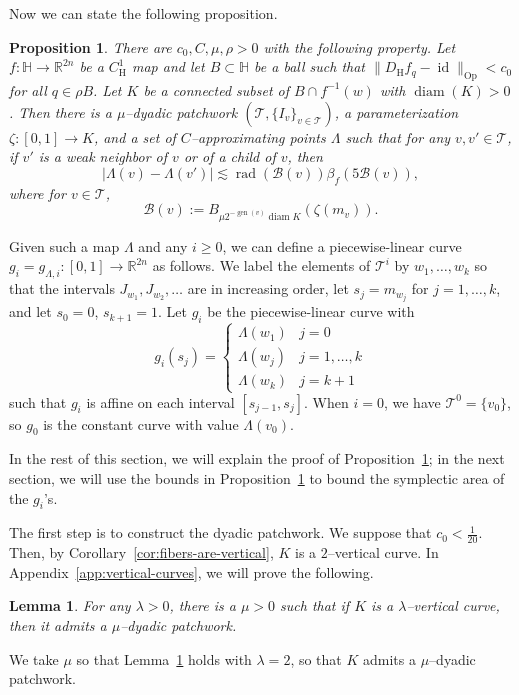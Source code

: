 \documentclass[12pt,reqno]{amsart}
\newcommand{\cB}{\mathcal{B}}
\newcommand{\cT}{\mathcal{T}}
\newcommand{\DfH}{D_\mathrm{H}f}
\DeclareMathOperator{\rad}{rad}
\DeclareMathOperator{\gen}{gen}
\newcommand{\HH}{\mathbb{H}}
\newcommand{\R}{\mathbb{R}}
\newcommand{\from}{\colon}
\newtheorem{lemma}[thm]{Lemma}
\newtheorem{prop}[thm]{Proposition}
\theoremstyle{remark}
\newcommand{\0}{\mathbf{0}}
\renewcommand{\1}{\mathbf 1}
\DeclareMathOperator{\diam}{diam}
\DeclareMathOperator{\id}{id}
\begin{document}
Now we can state the following proposition.
\begin{prop}\label{prop:construct-Lambda}
  There are $c_0, C, \mu, \rho>0$ with the following property. Let $f\from \HH\to \R^{2n}$ be a $C^1_{\mathrm{H}}$ map and let $B\subset \HH$ be a ball such that $\|\DfH_q - \id\|_{\mathrm{Op}} < c_0$ for all $q\in \rho B$. Let $K$ be a connected subset of $B\cap f^{-1}(w)$ with $\diam(K)>0$. Then there is a $\mu$--dyadic patchwork $(\cT, \{I_v\}_{v\in \cT})$, a parameterization $\zeta\from [0,1]\to K$, and a set of $C$--approximating points $\Lambda$ such that for any $v, v'\in \cT$, if $v'$ is a weak neighbor of $v$ or of a child of $v$, then
  \begin{equation}\label{eq:children-neighbors}
    |\Lambda(v) - \Lambda(v')| \lesssim \rad(\cB(v)) \beta_f(5 \cB(v)),
  \end{equation}
  where for $v\in \cT$,
  \begin{equation}\label{eq:def-cbv}
    \cB(v) := B_{\mu 2^{-\gen(v)}\diam K}(\zeta(m_v)).
  \end{equation}
    
\end{prop}

Given such a map $\Lambda$ and any $i\ge 0$, we can define a piecewise-linear curve $g_i = g_{\Lambda, i}\from [0,1]\to \R^{2n}$ as follows. We label the elements of $\cT^i$ by $w_1,\dots, w_{k}$ so that the intervals $J_{w_1},J_{w_2},\dots$ are in increasing order, let $s_j = m_{w_j}$ for $j=1,\dots, k$, and let $s_0=0$, $s_{k+1}=1$. Let $g_i$ be the piecewise-linear curve with
\begin{equation}\label{eq:def-gi-Lambda}
  g_i(s_j)= \begin{cases}
    \Lambda(w_1) & j=0\\
    \Lambda(w_j) & j = 1,\dots, k\\
    \Lambda(w_k) & j = k+1
  \end{cases}
\end{equation}
such that $g_i$ is affine on each interval $[s_{j-1},s_j]$. When $i=0$, we have $\cT^0=\{v_0\}$, so $g_0$ is the constant curve with value $\Lambda(v_0)$.

In the rest of this section, we will explain the proof of Proposition~\ref{prop:construct-Lambda}; in the next section, we will use the bounds in Proposition~\ref{prop:construct-Lambda} to bound the symplectic area of the $g_i$'s.

The first step is to construct the dyadic patchwork. We suppose that $c_0 < \frac{1}{20}$. Then, by Corollary~\ref{cor:fibers-are-vertical}, $K$ is a $2$--vertical curve. In Appendix~\ref{app:vertical-curves}, we will prove the following.
\begin{lemma}\label{lem:patchwork-exist}
  For any $\lambda>0$, there is a $\mu>0$ such that if $K$ is a $\lambda$--vertical curve, then it admits a $\mu$--dyadic patchwork.
\end{lemma}
We take $\mu$ so that Lemma~\ref{lem:patchwork-exist} holds with $\lambda=2$, so that $K$ admits a $\mu$--dyadic patchwork.
\end{document}
